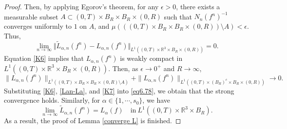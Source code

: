 \documentclass[10pt,a4paper]{amsart}
\def\R{\mathbb{R}}
\begin{document}
\begin{proof}
Then, by applying Egorov's theorem, for any $\epsilon > 0$, there exists a measurable subset $A \subset (0, T) \times B_R \times B_R \times (0, R)$ such that $ N_n (f^n)^{-1} $ converges uniformly to $1$ on $A$, and $\mu \left(((0, T) \times B_R \times B_R \times (0, R)) \setminus A\right) < \epsilon$. Thus,
\begin{equation}\label{Lan-La}
	\lim_{n\to\infty} \Vert \tilde{L}_{\alpha ,n}(f^n) - {L}_{\alpha ,n}(f^n) \Vert_{L^1((0,T)\times \R^3 \times B_R \times (0,R))}=0.
\end{equation}
Equation \eqref{K6} implies that $L_{\alpha,n}(f^n)$ is weakly compact in $L^1((0, T) \times \mathbb{R}^3 \times B_R \times (0, R))$. Then, as $\epsilon \to 0^+$ and $R \to \infty$,
\begin{equation}\label{K7}
	\|L_{\alpha,n}(f^n)\|_{L^1((0,T)\times B_R \times B_R \times (0,R)\setminus A)} + \|L_{\alpha,n}(f^n)\|_{L^1((0,T)\times (B_R)^c \times B_R \times (0,R))} \to 0.  
\end{equation}
Substituting \eqref{K6}, \eqref{Lan-La}, and \eqref{K7} into \eqref{eq6.78}, we obtain that the strong convergence holds.  
Similarly, for $\alpha \in \{1,\cdots,s_0\}$, we have 
\begin{equation*}
	\lim\limits_{n\rightarrow \infty } \tilde{L}_{\alpha ,n} (f^n) =L_{\alpha } (f) \quad \text{in}\ L^1((0,T)\times \R^3 \times B_R).
\end{equation*}
As a result, the proof of Lemma \ref{converge L} is finished.
\end{proof}
\end{document}
